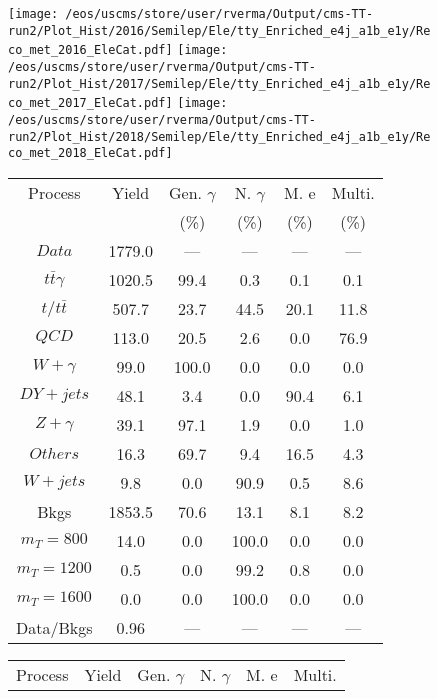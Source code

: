 \begin{figure}
\centering
\texttt{[image: /eos/uscms/store/user/rverma/Output/cms-TT-run2/Plot\_Hist/2016/Semilep/Ele/tty\_Enriched\_e4j\_a1b\_e1y/Reco\_met\_2016\_EleCat.pdf]}
\texttt{[image: /eos/uscms/store/user/rverma/Output/cms-TT-run2/Plot\_Hist/2017/Semilep/Ele/tty\_Enriched\_e4j\_a1b\_e1y/Reco\_met\_2017\_EleCat.pdf]}
\texttt{[image: /eos/uscms/store/user/rverma/Output/cms-TT-run2/Plot\_Hist/2018/Semilep/Ele/tty\_Enriched\_e4j\_a1b\_e1y/Reco\_met\_2018\_EleCat.pdf]}
\begin{minipage}[c]{0.32\textwidth}
\centering
\tiny{
\begin{tabular}{cccccc}
\hline
Process & Yield & Gen. $\gamma$ & N. $\gamma$ & M. e & Multi. \\
 &  & (\%) & (\%) & (\%) & (\%)  \\
\hline
                                                                      $ Data $ &  1779.0 &  --- &  --- &  --- &  ---\\
$ t\bar{t}\gamma $ &  1020.5 &  99.4 &  0.3 &  0.1 &  0.1\\
$ t/t\bar{t} $ &  507.7 &  23.7 &  44.5 &  20.1 &  11.8\\
$ QCD $ &  113.0 &  20.5 &  2.6 &  0.0 &  76.9\\
$ W+\gamma $ &  99.0 &  100.0 &  0.0 &  0.0 &  0.0\\
$ DY+jets $ &  48.1 &  3.4 &  0.0 &  90.4 &  6.1\\
$ Z+\gamma $ &  39.1 &  97.1 &  1.9 &  0.0 &  1.0\\
$ Others $ &  16.3 &  69.7 &  9.4 &  16.5 &  4.3\\
$ W+jets $ &  9.8 &  0.0 &  90.9 &  0.5 &  8.6\\
Bkgs &  1853.5 &  70.6 &  13.1 &  8.1 &  8.2\\
$ m_{T} = 800 $ &  14.0 &  0.0 &  100.0 &  0.0 &  0.0\\
$ m_{T} = 1200 $ &  0.5 &  0.0 &  99.2 &  0.8 &  0.0\\
$ m_{T} = 1600 $ &  0.0 &  0.0 &  100.0 &  0.0 &  0.0\\
Data/Bkgs &  0.96 &  --- &  --- &  --- &  ---\\
\hline
\end{tabular}
}
\end{minipage}
\begin{minipage}[c]{0.32\textwidth}
\centering
\tiny{
\begin{tabular}{cccccc}
\hline
Process & Yield & Gen. $\gamma$ & N. $\gamma$ & M. e & Multi. \\

\end{tabular}}
\end{minipage}
\end{figure}
